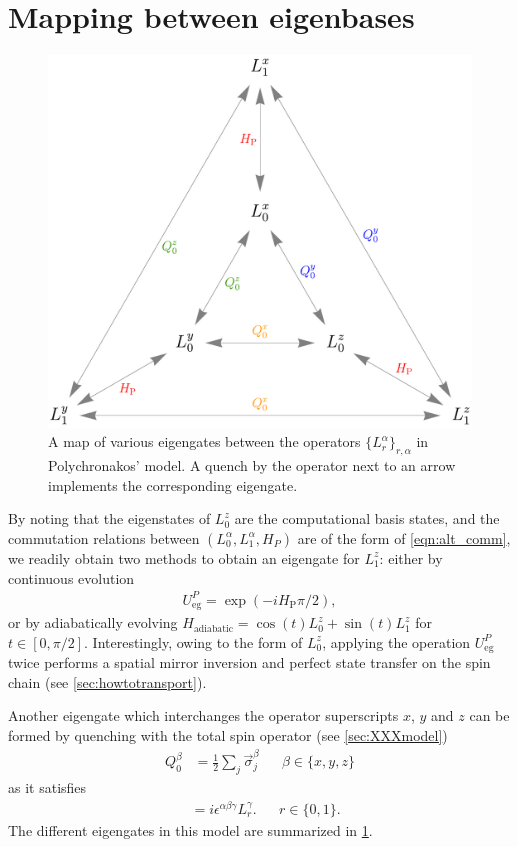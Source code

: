 \section{Mapping between eigenbases}
%
\begin{figure}[t]
\centering
\includegraphics[width=.7\textwidth]{img/frahm_egdiagram}
\caption{A map of various eigengates between the operators $\{ L_r^\alpha \}_{r,\alpha}$ in Polychronakos' model. A quench by the operator next to an arrow implements the corresponding eigengate. }
\label{fig:polychronakos_egs}
\end{figure}
%
By noting that the eigenstates of $L_0^z$ are the computational basis states, and the commutation relations between $( L_0^\alpha, L_1^\alpha, H_P )$ are of the form of \cref{eqn:alt_comm}, we readily obtain two methods to obtain an eigengate for $L_1^z$: either by continuous evolution 
\begin{align*}
U_\text{eg}^P = \exp( -i H_\text{P} \pi / 2 ),
\end{align*}
or by adiabatically evolving $H_\text{adiabatic} = \cos( t ) L_0^z + \sin( t ) L_1^z$ for $t\in [0,\pi/2]$. Interestingly, owing to the form of $L_0^z$, applying the operation $U_\text{eg}^P$ twice performs a spatial mirror inversion and perfect state transfer on the spin chain (see \cref{sec:howtotransport}).

Another eigengate which interchanges the operator superscripts $x$, $y$ and $z$ can be formed by quenching with the total spin operator (see \cref{sec:XXXmodel})
\begin{align*}
Q_0^\beta &= \frac{1}{2} \sum_j \vec{\sigma}_j^\beta  && \beta \in \{ x,y,z \} 
\end{align*}
as it satisfies 
\begin{align*}
[ Q_0^\alpha , L_r^\beta ] &= i \epsilon^{\alpha \beta \gamma} L_r^\gamma. && r \in \{ 0, 1 \}.
\end{align*}
The different eigengates in this model are summarized in \cref{fig:polychronakos_egs}. 


